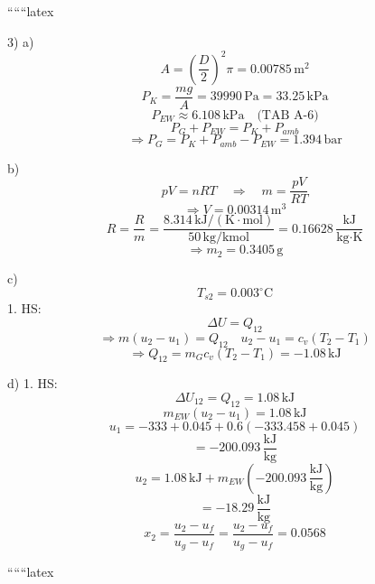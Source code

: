 
``````latex


3) a) 
\[
A = \left(\frac{D}{2}\right)^2 \pi = 0.00785 \, \text{m}^2
\]
\[
P_K = \frac{m g}{A} = 39990 \, \text{Pa} = 33.25 \, \text{kPa}
\]
\[
P_{EW} \approx 6.108 \, \text{kPa} \quad \text{(TAB A-6)}
\]
\[
P_G + P_{EW} = P_K + P_{amb}
\]
\[
\Rightarrow P_G = P_K + P_{amb} - P_{EW} = 1.394 \, \text{bar}
\]

b) 
\[
pV = nRT \quad \Rightarrow \quad m = \frac{pV}{RT}
\]
\[
\Rightarrow V = 0.00314 \, \text{m}^3
\]
\[
R = \frac{R}{m} = \frac{8.314 \, \text{kJ}/(\text{K} \cdot \text{mol})}{50 \, \text{kg}/\text{kmol}} = 0.16628 \, \frac{\text{kJ}}{\text{kg} \cdot \text{K}}
\]
\[
\Rightarrow m_2 = 0.3405 \, \text{g}
\]

c) 
\[
T_{s2} = 0.003^\circ \text{C}
\]
1. HS: 
\[
\Delta U = Q_{12}
\]
\[
\Rightarrow m (u_2 - u_1) = Q_{12} \quad u_2 - u_1 = c_v (T_2 - T_1)
\]
\[
\Rightarrow Q_{12} = m_G c_v (T_2 - T_1) = -1.08 \, \text{kJ}
\]

d) 
1. HS: 
\[
\Delta U_{12} = Q_{12} = 1.08 \, \text{kJ}
\]
\[
m_{EW} (u_2 - u_1) = 1.08 \, \text{kJ}
\]
\[
u_1 = -333 + 0.045 + 0.6 (-333.458 + 0.045)
\]
\[
= -200.093 \, \frac{\text{kJ}}{\text{kg}}
\]
\[
u_2 = 1.08 \, \text{kJ} + m_{EW} (-200.093 \, \frac{\text{kJ}}{\text{kg}})
\]
\[
= -18.29 \, \frac{\text{kJ}}{\text{kg}}
\]
\[
x_2 = \frac{u_2 - u_f}{u_g - u_f} = \frac{u_2 - u_f}{u_g - u_f} = 0.0568
\]

``````latex


